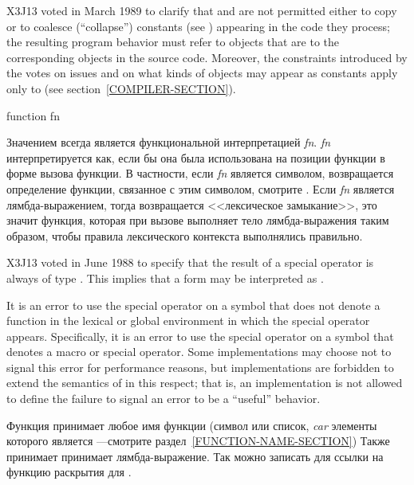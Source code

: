 \begin{defspec}
\begin{newer}
X3J13 voted in March 1989  to clarify that
 and  are not permitted either to copy or
to coalesce (``collapse'') constants (see )
appearing in the code they process; the resulting
program behavior must refer to objects that are  to the
corresponding objects in the source code.
Moreover, the constraints introduced by the votes on
issues 
and 
on what kinds of objects may appear
as constants apply only to  (see section~\ref{COMPILER-SECTION}).
\end{newer}
\end{defspec}

\begin{defspec}
function fn

Значением  всегда является функциональной интерпретацией
\emph{fn}. \emph{fn} интерпретируется как, если бы она была использована на
позиции функции в форме вызова функции.
В частности, если \emph{fn} является символом, возвращается определение функции,
связанное с этим символом, смотрите .
Если \emph{fn} является лямбда-выражением, тогда возвращается <<лексическое
замыкание>>, это значит функция, которая при вызове выполняет тело
лямбда-выражения таким образом, чтобы правила лексического контекста выполнялись 
правильно.

\begin{newer}
X3J13 voted in June 1988 
to specify that the result of a  special operator is always
of type .  This implies that a form 
may be interpreted as .

It is an error to use the  special operator on a
    symbol that does not denote a function in the lexical or global environment in
    which the special operator appears.  Specifically, it is an error to use the
     special operator on a symbol that denotes a macro or special operator.
    Some implementations may choose not to signal this error for
        performance reasons, but implementations are forbidden
        to extend the semantics of  in this respect; that is, an
        implementation is not allowed to
        define the failure to signal an error to be a ``useful'' behavior.
\end{newer}

Функция 
принимает любое имя функции (символ или список,
\emph{car} элементы которого является ---смотрите раздел~\ref{FUNCTION-NAME-SECTION})
Также принимает принимает лямбда-выражение.
Так можно записать  для ссылки на функцию раскрытия
 для .


\end{defspec}
